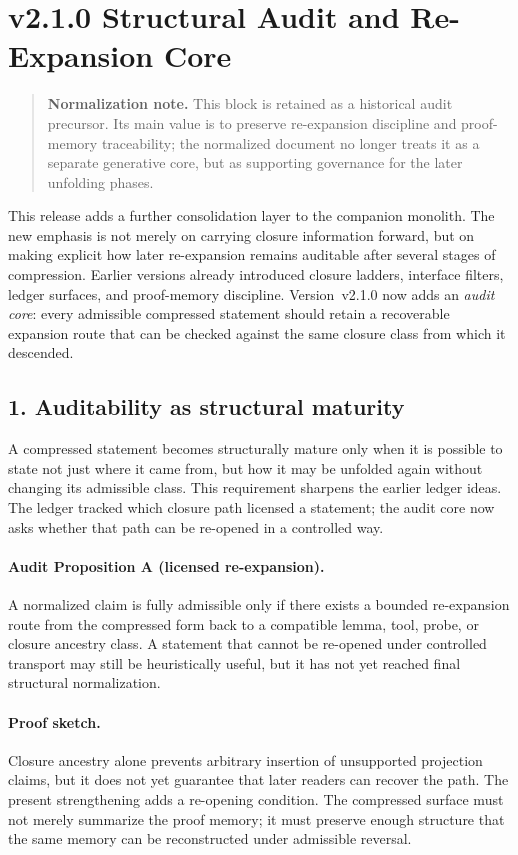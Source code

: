 \section*{v2.1.0 Structural Audit and Re-Expansion Core}
\begin{quote}
\textbf{Normalization note.} This block is retained as a historical audit precursor. Its main value is to preserve re-expansion discipline and proof-memory traceability; the normalized document no longer treats it as a separate generative core, but as supporting governance for the later unfolding phases.
\end{quote}

This release adds a further consolidation layer to the companion monolith. The
new emphasis is not merely on carrying closure information forward, but on
making explicit how later re-expansion remains auditable after several stages of
compression. Earlier versions already introduced closure ladders, interface
filters, ledger surfaces, and proof-memory discipline. Version~v2.1.0 now
adds an \emph{audit core}: every admissible compressed statement should retain a
recoverable expansion route that can be checked against the same closure class
from which it descended.

\subsection*{1. Auditability as structural maturity}
A compressed statement becomes structurally mature only when it is possible to
state not just where it came from, but how it may be unfolded again without
changing its admissible class. This requirement sharpens the earlier ledger
ideas. The ledger tracked which closure path licensed a statement; the audit
core now asks whether that path can be re-opened in a controlled way.

\paragraph{Audit Proposition A (licensed re-expansion).}
A normalized claim is fully admissible only if there exists a bounded
re-expansion route from the compressed form back to a compatible lemma, tool,
probe, or closure ancestry class. A statement that cannot be re-opened under
controlled transport may still be heuristically useful, but it has not yet
reached final structural normalization.

\paragraph{Proof sketch.}
Closure ancestry alone prevents arbitrary insertion of unsupported projection
claims, but it does not yet guarantee that later readers can recover the path.
The present strengthening adds a re-opening condition. The compressed surface
must not merely summarize the proof memory; it must preserve enough structure
that the same memory can be reconstructed under admissible reversal.

